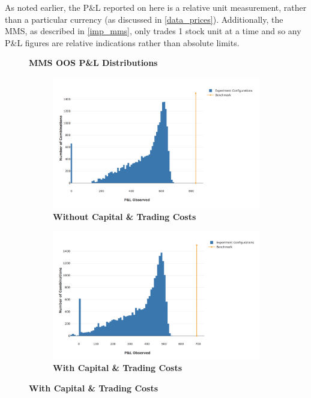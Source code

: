 \documentclass[a4paper,11pt,oneside]{article}
\theoremstyle{plain}
\theoremstyle{definition}
\begin{document}
	As noted earlier, the P\&L reported on here is a relative unit measurement, rather than a particular currency (as discussed in \ref{data_prices}). Additionally, the MMS, as described in \ref{imp_mms}, only trades 1 stock unit at a time and so any P\&L figures are relative indications rather than absolute limits.
	
	
	\begin{figure}[H]
		\centering
		\textbf{MMS OOS P\&L Distributions}
		\begin{subfigure}{.44\textwidth}
			\centering 
			\includegraphics[scale=0.3]{images/results/mms/profits_nocost.png} 
			\caption{\textbf{Without Capital \& Trading Costs}}
			\label{figure-results_pl_pdf_nocapital}
		\end{subfigure}%
		\begin{subfigure}{.5\textwidth}
			\includegraphics[scale=0.31]{images/results/mms/profits_cost.png} 
			\caption{\textbf{With Capital \& Trading Costs}}
			\label{figure-results_pl_pdf_cost_capital}

\end{subfigure}
\end{figure}
\end{document}

